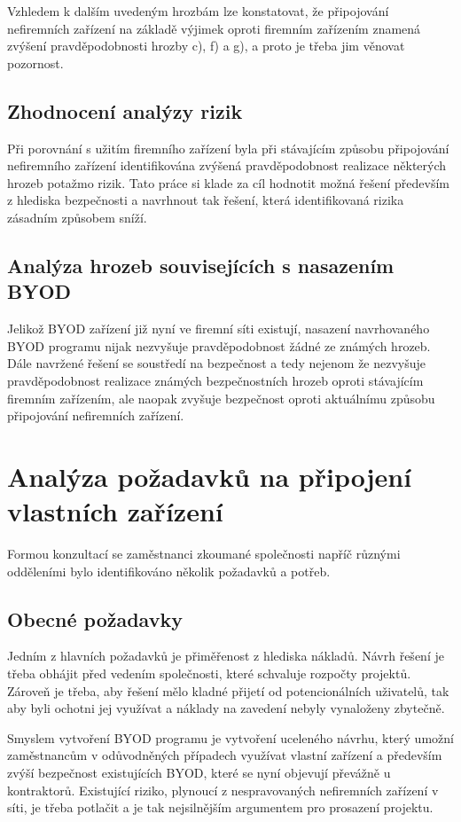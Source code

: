 Vzhledem k dalším uvedeným hrozbám lze konstatovat, že připojování nefiremních zařízení na základě výjimek oproti firemním zařízením znamená zvýšení pravděpodobnosti hrozby c), f) a g), a proto je třeba jim věnovat pozornost. 

\subsection{Zhodnocení analýzy rizik}\label{analyzaRizik}
Při porovnání s užitím firemního zařízení byla při stávajícím způsobu připojování nefiremního zařízení identifikována zvýšená pravděpodobnost realizace některých hrozeb potažmo rizik. Tato práce si klade za cíl hodnotit možná řešení především z hlediska bezpečnosti a navrhnout tak řešení, která identifikovaná rizika zásadním způsobem sníží.

\subsection{Analýza hrozeb souvisejících s nasazením BYOD}
Jelikož BYOD zařízení již nyní ve firemní síti existují, nasazení navrhovaného BYOD programu nijak nezvyšuje pravděpodobnost žádné ze známých hrozeb. Dále navržené řešení se soustředí na bezpečnost a tedy nejenom že nezvyšuje pravděpodobnost realizace známých bezpečnostních hrozeb oproti stávajícím firemním zařízením, ale naopak zvyšuje bezpečnost oproti aktuálnímu způsobu připojování nefiremních zařízení.


\section{Analýza požadavků na připojení vlastních zařízení} 
Formou konzultací se zaměstnanci zkoumané společnosti napříč různými odděleními bylo identifikováno několik požadavků a potřeb.

\subsection{Obecné požadavky}\label{obecnePozadavky}

Jedním z hlavních požadavků je přiměřenost z hlediska nákladů. Návrh řešení je třeba obhájit před vedením společnosti, které schvaluje rozpočty projektů. Zároveň je třeba, aby řešení mělo kladné přijetí od potencionálních uživatelů, tak aby byli ochotni jej využívat a náklady na zavedení nebyly vynaloženy zbytečně.  

Smyslem vytvoření BYOD programu je vytvoření uceleného návrhu, který umožní zaměstnancům v odůvodněných případech využívat vlastní zařízení a především zvýší bezpečnost existujících BYOD, které se nyní objevují převážně u kontraktorů. Existující riziko, plynoucí z nespravovaných nefiremních zařízení v síti, je třeba potlačit a je tak nejsilnějším argumentem pro prosazení projektu.

